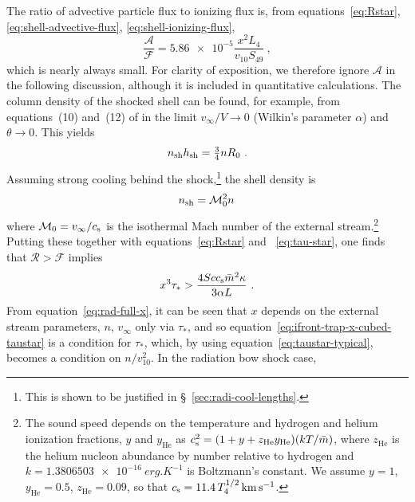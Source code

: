 The ratio of advective particle flux to ionizing flux is, from equations~\eqref{eq:Rstar}, \eqref{eq:shell-advective-flux}, \eqref{eq:shell-ionizing-flux},
\begin{equation}
  \label{eq:advective-over-ionizing-flux}
  \frac{\mathcal{A}}{\mathcal{F}} = \num{5.86e-5} \frac{x^2 L_4}{v_{10} S_{49}} \ , 
\end{equation}
which is nearly always small.  For clarity of exposition, we therefore
ignore \(\mathcal{A}\) in the following discussion, although it is
included in quantitative calculations.  The column density of the
shocked shell can be found, for example, from equations~(10) and~(12)
of \citet{Wilkin:1996a} in the limit \(v_\infty/V \to 0\) (Wilkin's parameter
\(\alpha\)) and \(\theta \to 0\).  This yields
\begin{equation}
  \label{eq:shocked-shell-column}
  n\shell h\shell = \tfrac34 n R_0 \ .
\end{equation}
Assuming strong cooling behind the shock,\footnote{%
  This is shown to be justified in \S~\ref{sec:radi-cool-lengths}.
} %
the shell density is
\begin{equation}
  \label{eq:isothermal-shell-density}
  n\shell = \mathcal{M}_0^2 n \,
\end{equation}
where
\(\mathcal{M}_0 = v_\infty / \sound\) is the isothermal Mach number of the
external stream.\footnote{%
  \label{fn:temperature-dependence}
  The sound speed depends on the temperature and hydrogen and helium
  ionization fractions, \(y\) and \(y_{\text{He}}\) as
  \(\sound^2 = (1 + y + z_{\text{He}} y_{\text{He}}) (k T /
  \bar{m})\), where \(z_{\text{He}}\) is the helium nucleon abundance
  by number relative to hydrogen and
  \(k = \SI{1.3806503e-16}{erg.K^{-1}}\) is Boltzmann's constant.  We
  assume \(y = 1\), \(y_{\text{He}} = 0.5\), \(z_{\text{He}} = 0.09\),
  so that \(\sound = \num{11.4}\, T_4^{1/2}\, \si{km.s^{-1}}\). } %
Putting these together with equations~\eqref{eq:Rstar} and
~\eqref{eq:tau-star}, one finds that \(\mathcal{R} > \mathcal{F}\)
implies
\begin{equation}
  \label{eq:ifront-trap-x-cubed-taustar}
  x^3 \tau_* > \frac{4 S c \sound \bar{m}^2 \kappa}{3 \alpha L} \ .
\end{equation}
From equation~\eqref{eq:rad-full-x}, it can be seen that \(x\) depends
on the external stream parameters, \(n\), \(v_\infty\) only via
\(\tau_*\), and so equation~\eqref{eq:ifront-trap-x-cubed-taustar} is a
condition for \(\tau_*\), which, by using equation~\eqref{eq:taustar-typical}, becomes a condition on \(n / v_{10}^2\).  In the radiation bow shock case,
